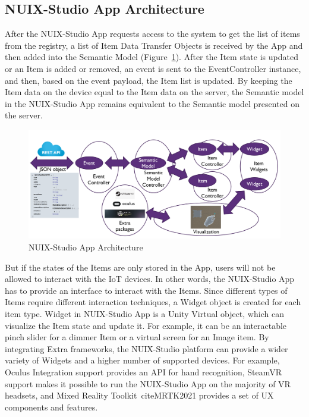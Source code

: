 \subsection{NUIX-Studio App Architecture}

After the NUIX-Studio App requests access to the system to get the list of items from the registry, a list of Item Data Transfer Objects is received by the App and then added into the Semantic Model (Figure~\ref{fig:AppArchitecture-figure}). After the Item state is updated or an Item is added or removed, an event is sent to the EventController instance, and then, based on the event payload, the Item list is updated.  By keeping the Item data on the device equal to the Item data on the server, the Semantic model in the NUIX-Studio App remains equivalent to the Semantic model presented on the server. 

\begin{figure}
  \centering
  \includegraphics[width=0.9\linewidth]{figures/AppArchitecture.png}
  \caption{NUIX-Studio App Architecture}
  \label{fig:AppArchitecture-figure}
\end{figure}

But if the states of the Items are only stored in the App, users will not be allowed to interact with the IoT devices. In other words, the NUIX-Studio App has to provide an interface to interact with the Items. Since different types of Items require different interaction techniques, a Widget object is created for each item type. Widget in NUIX-Studio App is a Unity Virtual object, which can visualize the Item state and update it. For example, it can be an interactable pinch slider for a dimmer Item or a virtual screen for an Image item. By integrating Extra frameworks, the NUIX-Studio platform can provide a wider variety of Widgets and a higher number of supported devices. For example, Oculus Integration support provides an API for hand recognition, SteamVR~\cite{SteamVR2021} support makes it possible to run the NUIX-Studio App on the majority of VR headsets, and Mixed Reality Toolkit~cite{MRTK2021} provides a set of UX components and features.


